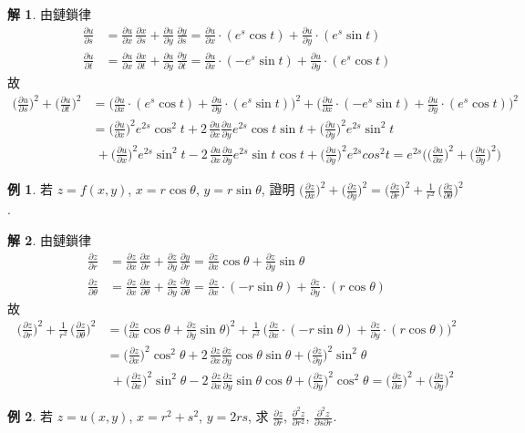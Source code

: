 \documentclass[12pt]{extarticle}
\newcommand{\ds}{\displaystyle}
\theoremstyle{definition}
\newtheorem*{ex}{例}
\newtheorem*{sol}{解}
\newcommand{\pdiff}[2]{\frac{\partial #1}{\partial #2}}
\newcommand{\pdifft}[2]{\frac{\partial^2 #1}{\partial #2^2}}
\begin{document}
\begin{sol} 由鏈鎖律
  \begin{align*}
    \pdiff{u}{s} &= \pdiff{u}{x}\,\pdiff{x}{s} + \pdiff{u}{y}\,\pdiff{y}{s} = \pdiff{u}{x}\cdot(e^s\cos t) + \pdiff{u}{y}\cdot(e^s\sin t)\\
    \pdiff{u}{t} &= \pdiff{u}{x}\,\pdiff{x}{t} + \pdiff{u}{y}\,\pdiff{y}{t} = \pdiff{u}{x}\cdot(-e^s\sin t) + \pdiff{u}{y}\cdot(e^s\cos t)
  \end{align*}
  故
  \begin{align*}
    \bigg(\pdiff{u}{s}\bigg)^2 + \bigg(\pdiff{u}{t}\bigg)^2 &= \bigg(\pdiff{u}{x}\cdot(e^s\cos t) + \pdiff{u}{y}\cdot(e^s\sin t)\bigg)^2 + \bigg(\pdiff{u}{x}\cdot(-e^s\sin t) + \pdiff{u}{y}\cdot(e^s\cos t)\bigg)^2 \\
    &= \bigg(\pdiff{u}{x}\bigg)^2 e^{2s} \cos^2 t + 2\,\pdiff{u}{x}\pdiff{u}{y}e^{2s}\cos t\sin t + \bigg(\pdiff{u}{y}\bigg)^2 e^{2s}\sin^2 t \\ &\; + \bigg(\pdiff{u}{x}\bigg)^2 e^{2s}\sin^2 t - 2\,\pdiff{u}{x}\pdiff{u}{y} e^{2s} \sin t\cos t + \bigg(\pdiff{u}{y}\bigg)^2 e^{2s} cos^2 t = e^{2s}\bigg(\bigg(\pdiff{u}{x}\bigg)^2 + \bigg(\pdiff{u}{y}\bigg)^2\bigg) 
  \end{align*}
\end{sol}

\begin{ex}
  若 $\ds z = f(x, y)$, $\ds x = r\cos\theta$, $\ds y = r\sin\theta$, 證明 $\ds\bigg(\pdiff{z}{x}\bigg)^2 + \bigg(\pdiff{z}{y}\bigg)^2 = \bigg(\pdiff{z}{r}\bigg)^2 + \frac{1}{r^2}\,\bigg(\pdiff{z}{\theta}\bigg)^2$.   
\end{ex}

\begin{sol} 由鏈鎖律
  \begin{align*}
    \pdiff{z}{r} &= \pdiff{z}{x}\,\pdiff{x}{r} + \pdiff{z}{y}\,\pdiff{y}{r} = \pdiff{z}{x}\cos\theta + \pdiff{z}{y}\sin\theta \\
    \pdiff{z}{\theta} &= \pdiff{z}{x}\,\pdiff{x}{\theta} + \pdiff{z}{y}\,\pdiff{y}{\theta} = \pdiff{z}{x}\cdot(-r\sin\theta) + \pdiff{z}{y}\cdot(r\cos\theta)
  \end{align*}
  故
  \begin{align*}
    \bigg(\pdiff{z}{r}\bigg)^2 + \frac{1}{r^2}\,\bigg(\pdiff{z}{\theta}\bigg)^2 &= \bigg(\pdiff{z}{x}\cos\theta + \pdiff{z}{y}\sin\theta\bigg)^2 + \frac{1}{r^2}\,\bigg(\pdiff{z}{x}\cdot(-r\sin\theta) + \pdiff{z}{y}\cdot(r\cos\theta)\bigg)^2 \\
    &= \bigg(\pdiff{z}{x}\bigg)^2\cos^2\theta + 2\,\pdiff{z}{x}\pdiff{z}{y}\cos\theta\sin\theta + \bigg(\pdiff{z}{y}\bigg)^2\sin^2\theta \\ &\; + \bigg(\pdiff{z}{x}\bigg)^2\sin^2\theta - 2\,\pdiff{z}{x}\pdiff{z}{y}\sin\theta\cos\theta + \bigg(\pdiff{z}{y}\bigg)^2\cos^2\theta = \bigg(\pdiff{z}{x}\bigg)^2 + \bigg(\pdiff{z}{y}\bigg)^2 
  \end{align*}
\end{sol}
\begin{ex}
  若 $\ds z = u(x, y)$, $\ds x = r^2 + s^2$, $\ds y = 2rs$, 求 $\ds\pdiff{z}{r}$, $\ds\pdifft{z}{r}$, $\ds\frac{\partial^2 z}{\partial s\partial r}$. 
\end{ex}
\end{document}
